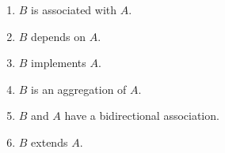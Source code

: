 \documentclass[letterpaper] {article}
\begin{document}
\begin{itemize}
\begin{center}
            \end{center}
                \begin{enumerate}
                    \item $B$ is associated with $A$. 
                    \item $B$ depends on $A$. 
                    \item $B$ implements $A$.
                    \item $B$ is an aggregation of $A$. 
                    \item $B$ and $A$ have a bidirectional association.
                    \item $B$ extends $A$.
                \end{enumerate}
    \end{itemize}
\end{document}
